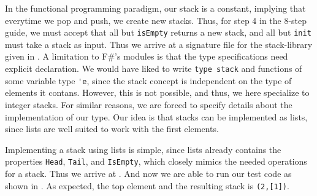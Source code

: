 \documentclass[fsharpNotes.tex]{subfiles}
\begin{document}
In the functional programming paradigm, our stack is a constant, implying that everytime we pop and push, we create new stacks. Thus, for step 4 in the 8-step guide, we must accept that all but \lstinline{isEmpty} returns a new stack, and all but \lstinline{init} must take a stack as input. Thus we arrive at a signature file for the stack-library given in .
A limitation to F\#'s modules is that the type specifications need explicit declaration. We would have liked to write \lstinline{type stack} and functions of some variable type \lstinline{'e}, since the stack concept is independent on the type of elements it contans. However, this is not possible, and thus, we here specialize to integer stacks. For similar reasons, we are forced to specify details about the implementation of our type. Our idea is that stacks can be implemented as lists, since lists are well suited to work with the first elements.

Implementing a stack using lists is simple, since lists already contains the properties \lstinline{Head}, \lstinline{Tail}, and \lstinline{IsEmpty}, which closely mimics the needed operations for a stack. Thus we arrive at .
And now we are able to run our test code as shown in .
As expected, the top element and the resulting stack is \lstinline{(2,[1])}.
\end{document}
